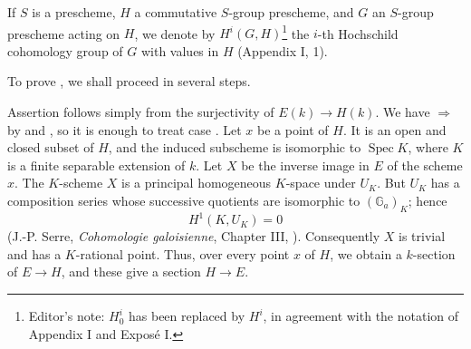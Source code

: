 

If \(S\) is a prescheme, \(H\) a commutative \(S\)-group
prescheme, and \(G\) an \(S\)-group prescheme acting on \(H\), we
denote by \(H^i(G,H)\)\footnote{Editor's note: \(H_0^i\) has been
replaced by \(H^i\), in agreement with the notation of Appendix I
and Exposé I.} the \(i\)-th Hochschild cohomology group of \(G\)
with values in \(H\) (Appendix I, 1).

To prove , we shall proceed in several steps.



Assertion  follows simply from the surjectivity of
\(E(k)\to H(k)\).  We have \(\Rightarrow\) by 
and , so it is enough to treat case .  Let \(x\) be a
point of \(H\).  It is an open and closed subset of \(H\), and
the induced subscheme is isomorphic to \(\operatorname{Spec}K\),
where \(K\) is a finite separable extension of \(k\).  Let \(X\)
be the inverse image in \(E\) of the scheme \(x\).  The
\(K\)-scheme \(X\) is a principal homogeneous \(K\)-space under
\(U_K\).  But \(U_K\) has a composition series whose successive
quotients are isomorphic to \((\mathbb G_a)_K\); hence
\[
  H^1(K,U_K)=0
\]
(J.-P. Serre, \emph{Cohomologie galoisienne}, Chapter III,
).  Consequently \(X\) is trivial and has a
\(K\)-rational point.  Thus, over every point \(x\) of \(H\), we
obtain a \(k\)-section of \(E\to H\), and these give a section
\(H\to E\).

